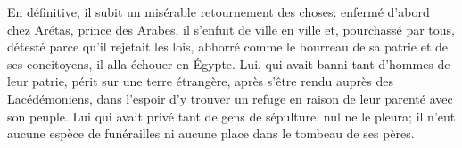 En définitive, il subit un misérable retournement des choses:
	enfermé d’abord chez Arétas, prince des Arabes,
	il s’enfuit de ville en ville et, pourchassé par tous,
	détesté parce qu’il rejetait les lois,
	abhorré comme le bourreau de sa patrie et de ses concitoyens,
	il alla échouer en Égypte.
Lui, qui avait banni tant d’hommes de leur patrie, périt sur une terre étrangère,
	après s’être rendu auprès des Lacédémoniens,
	dans l’espoir d’y trouver un refuge en raison de leur parenté avec son peuple.
Lui qui avait privé tant de gens de sépulture, nul ne le pleura;
	il n’eut aucune espèce de funérailles ni aucune place dans le tombeau de ses pères.
